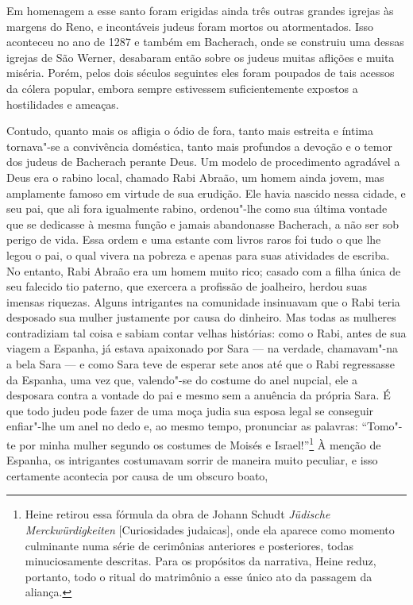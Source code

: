  Em homenagem a esse santo foram erigidas ainda três outras grandes
igrejas às margens do Reno, e incontáveis judeus foram mortos ou
atormentados. Isso aconteceu no ano de 1287 e também em Bacherach, onde
se construiu uma dessas igrejas de São Werner, desabaram então sobre os
judeus muitas aflições e muita miséria. Porém, pelos dois séculos
seguintes eles foram poupados de tais acessos da cólera popular, embora
sempre estivessem suficientemente expostos a hostilidades e ameaças.

Contudo, quanto mais os afligia o ódio de fora, tanto mais estreita e
íntima tornava"-se a convivência doméstica, tanto mais profundos a
devoção e o temor dos judeus de Bacherach perante Deus. Um modelo de
procedimento agradável a Deus era o rabino local, chamado Rabi Abraão,
um homem ainda jovem, mas amplamente famoso em virtude de sua erudição.
Ele havia nascido nessa cidade, e seu pai, que ali fora igualmente
rabino, ordenou"-lhe como sua última vontade que se dedicasse à mesma
função e jamais abandonasse Bacherach, a não ser sob perigo de vida.
Essa ordem e uma estante com livros raros foi tudo o que lhe legou o
pai, o qual vivera na pobreza e apenas para suas atividades de escriba.
No entanto, Rabi Abraão era um homem muito rico; casado com a filha
única de seu falecido tio paterno, que exercera a profissão de
joalheiro, herdou suas imensas riquezas. Alguns intrigantes na
comunidade insinuavam que o Rabi teria desposado sua mulher justamente
por causa do dinheiro. Mas todas as mulheres contradiziam tal coisa e
sabiam contar velhas histórias: como o Rabi, antes de sua viagem a
Espanha, já estava apaixonado por Sara --- na verdade, chamavam"-na a
bela Sara --- e como Sara teve de esperar sete anos até que o Rabi
regressasse da Espanha, uma vez que, valendo"-se do costume do anel
nupcial, ele a desposara contra a vontade do pai e mesmo sem a anuência
da própria Sara. É que todo judeu pode fazer de uma moça judia sua
esposa legal se conseguir enfiar"-lhe um anel no dedo e, ao mesmo
tempo, pronunciar as palavras: ``Tomo"-te por minha mulher segundo os
costumes de Moisés e
Israel!''\footnote{ Heine
retirou essa fórmula da obra de Johann Schudt \textit{Jüdische
Merckwürdigkeiten }[Curiosidades judaicas], onde ela aparece como
momento culminante numa série de cerimônias anteriores e posteriores,
todas minuciosamente descritas. Para os propósitos da narrativa, Heine
reduz, portanto, todo o ritual do matrimônio a esse único ato da
passagem da aliança.}
 À menção de Espanha, os intrigantes costumavam sorrir de maneira muito
peculiar, e isso certamente acontecia por causa de um obscuro boato,
